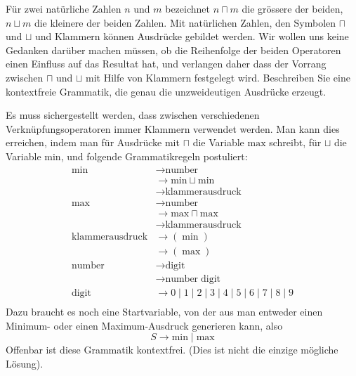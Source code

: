 Für zwei natürliche Zahlen $n$ und $m$ bezeichnet $n\sqcap m$ die
grössere der beiden, $n\sqcup m$ die kleinere der beiden Zahlen.
Mit natürlichen Zahlen, den Symbolen $\sqcap$ und $\sqcup$ und Klammern
können Ausdrücke gebildet werden.
Wir wollen uns keine Gedanken darüber machen müssen, ob die Reihenfolge
der beiden Operatoren einen Einfluss auf das Resultat hat, und
verlangen daher
dass der Vorrang zwischen $\sqcap$ und $\sqcup$ mit Hilfe
von Klammern festgelegt wird. Beschreiben Sie eine
kontextfreie Grammatik, die genau die unzweideutigen Ausdrücke
erzeugt.


\begin{loesung}
Es muss sichergestellt werden, dass zwischen verschiedenen
Verknüpfungsoperatoren immer Klammern verwendet werden. Man kann
dies erreichen, indem man für Ausdrücke mit $\sqcap$ die Variable
$\text{max}$ schreibt, für $\sqcup$ die Variable $\text{min}$, und
folgende Grammatikregeln postuliert:
\begin{align*}
\text{min}&\rightarrow \text{number}\\
&\rightarrow \text{min}\sqcup \text{min}\\
&\rightarrow\text{klammerausdruck}\\
\text{max}&\rightarrow \text{number}\\
&\rightarrow \text{max}\sqcap \text{max}\\
&\rightarrow\text{klammerausdruck}\\
\text{klammerausdruck}&\rightarrow (\;\text{min}\;)\\
&\rightarrow (\;\text{max}\;)\\
\text{number}&\rightarrow\text{digit}\\
&\rightarrow\text{number}\;\text{digit}\\
\text{digit}&\rightarrow 0
\mid 1
\mid 2
\mid 3
\mid 4
\mid 5
\mid 6
\mid 7
\mid 8
\mid 9
\\
\end{align*}
Dazu braucht es noch eine Startvariable, von der aus man entweder einen
Minimum- oder einen Maximum-Ausdruck generieren kann, also
$$S\rightarrow \text{min}\mid \text{max}$$
Offenbar ist diese Grammatik kontextfrei.
(Dies ist nicht die einzige mögliche Lösung).
\end{loesung}
